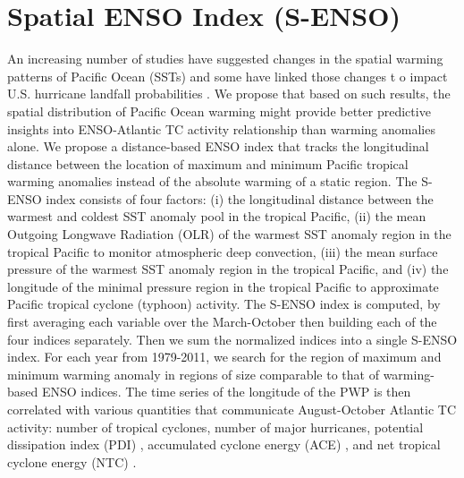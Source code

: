 \documentclass[]{article}
\begin{document}
\section{Spatial ENSO Index (S-ENSO)}
An increasing number of studies have suggested changes in the spatial warming patterns of Pacific Ocean (SSTs) \cite{yeh2009} and some have linked those changes t o impact U.S. hurricane landfall probabilities \cite{kim2009}. We propose that based on such results, the spatial distribution of Pacific Ocean warming might provide better predictive insights into ENSO-Atlantic TC activity relationship than warming anomalies alone. We propose a distance-based ENSO index that tracks the longitudinal distance between the location of maximum and minimum Pacific tropical warming anomalies instead of the absolute warming of a static region. The S-ENSO index consists of four factors: (i) the longitudinal distance between the warmest and coldest SST anomaly pool in the tropical Pacific, (ii) the mean Outgoing Longwave Radiation (OLR) of the warmest SST anomaly region in the tropical Pacific to monitor atmospheric deep convection, (iii) the mean surface pressure of the warmest SST anomaly region in the tropical Pacific, and (iv) the longitude of the minimal pressure region in the tropical Pacific to approximate Pacific tropical cyclone (typhoon) activity. The S-ENSO index is computed, by first averaging each variable over the March-October then building each of the four indices separately. Then we sum the normalized indices into a single S-ENSO index. For each year from 1979-2011, we search for the region of maximum and minimum warming anomaly in regions of size comparable to that of warming-based ENSO indices. The time series of the longitude of the PWP is then correlated with various quantities that communicate August-October Atlantic TC activity: number of tropical cyclones, number of major hurricanes, potential dissipation index (PDI) \cite{emanuel2005a}, accumulated cyclone energy (ACE) \cite{Bell2000}, and net tropical cyclone energy (NTC) \cite{goldenberg2001}.



\end{document}
